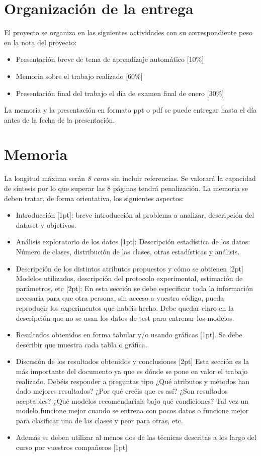 \documentclass{esannV2}
\begin{document}
\section{Organización de la entrega}
El proyecto se organiza en las siguientes actividades con su correspondiente
peso en la nota del proyecto:

\begin{itemize}
\item Presentación breve de tema de aprendizaje automático [10\%]
\item Memoria sobre el trabajo realizado [60\%]
\item Presentación final del trabajo el día de examen final de enero [30\%]
\end{itemize}

La memoria y la presentación en formato ppt o pdf se puede entregar hasta el día
antes de la fecha de la presentación.

\section{Memoria}
La longitud máxima serán \emph{8 caras} sin incluir referencias. Se valorará la
capacidad de síntesis por lo que superar las 8 páginas tendrá penalización. La
memoria se deben tratar, de forma orientativa, los siguientes aspectos:

\begin{itemize}
\item Introducción [1pt]: breve introducción al problema a analizar, descripción del dataset y objetivos.
\item Análisis exploratorio de los datos [1pt]: Descripción estadística de los datos: Número de clases, distribución de las clases, otras estadísticas y análisis.
\item Descripción de los distintos atributos  propuestos y cómo se obtienen [2pt]
Modelos utilizados, descripción del protocolo experimental, estimación de parámetros, etc [2pt]: En esta sección se debe especificar toda la información necesaria para que otra persona, sin acceso a vuestro código, pueda reproducir los experimentos que habéis hecho. Debe quedar claro en la descripción que no se usan los datos de test para entrenar los modelos.
\item Resultados obtenidos en forma tabular y/o usando gráficas [1pt]. Se debe describir que muestra cada tabla o gráfica.
\item Discusión de los resultados obtenidos y conclusiones [2pt] Esta sección es la más importante del documento ya que es dónde se pone en valor el trabajo realizado. Debéis responder a preguntas  tipo ¿Qué atributos y métodos han dado mejores resultados? ¿Por qué creéis que es así? ¿Son resultados aceptables? ¿Qué modelos recomendaríais bajo qué condiciones? Tal vez un modelo funcione mejor cuando se entrena con pocos datos o funcione mejor para clasificar una de las clases y peor para otras, etc.
\item Además se deben utilizar al menos dos de las técnicas descritas a los largo del curso por vuestros compañeros [1pt]
\end{itemize}
\end{document}

